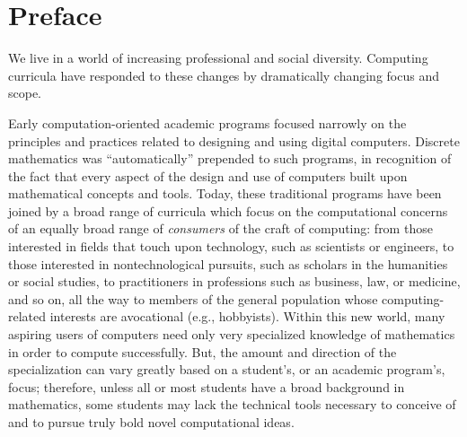 
\chapter*{Preface}

We live in a world of increasing professional and social diversity.  Computing curricula have responded to these changes by dramatically changing focus and scope.

\smallskip

Early computation-oriented academic programs focused narrowly on the principles and practices related to designing and using digital computers.  Discrete mathematics was ``automatically'' prepended to such programs, in recognition of the fact that every aspect of the design and use of computers built upon mathematical concepts and tools.  Today, these traditional programs have been joined by a broad range of curricula which focus on the computational concerns of an equally broad range of {\em consumers} of the craft of computing: from those interested in fields that touch upon technology, such as scientists or engineers, to those interested in nontechnological pursuits, such as scholars in the humanities or social studies, to practitioners in professions such as business, law, or medicine, and so on, all the way to members of the general population whose computing-related interests are avocational (e.g., hobbyists).  Within this new world, many aspiring users of computers need only very specialized knowledge of mathematics in order to compute successfully.  But, the amount and direction of the specialization can vary greatly based on a student's, or an academic program's, focus; therefore, unless all or most students have a broad background in mathematics, some students may lack the technical tools necessary to conceive of and to pursue truly bold novel computational ideas.

\bigskip

